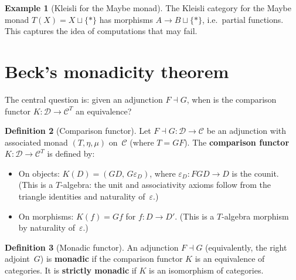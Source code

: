 \documentclass[a4paper,12pt]{book}
\theoremstyle{definition}
\newtheorem{definition}{Definition}[section]
\newtheorem{example}[definition]{Example}
\theoremstyle{plain}
\theoremstyle{remark}
\begin{document}
\begin{example}[Kleisli for the Maybe monad]\label{ex:kleisli-maybe}
The Kleisli category for the Maybe monad $T(X)=X\sqcup\{*\}$ has
morphisms $A\to B\sqcup\{*\}$, i.e.\ partial functions.  This
captures the idea of computations that may fail.
\end{example}


\section{Beck's monadicity theorem}\label{sec:beck}

The central question is: given an adjunction $F\dashv G$, when is the
comparison functor $K\colon\mathcal{D}\to\mathcal{C}^T$ an equivalence?

\begin{definition}[Comparison functor]\label{def:comparison-functor}
Let $F\dashv G\colon\mathcal{D}\to\mathcal{C}$ be an adjunction with
associated monad $(T,\eta,\mu)$ on~$\mathcal{C}$ (where $T = GF$).
The \textbf{comparison functor}
$K\colon\mathcal{D}\to\mathcal{C}^T$
is defined by:
\begin{itemize}
\item On objects: $K(D) = (GD,\, G\varepsilon_D)$, where
    $\varepsilon_D\colon FGD\to D$ is the counit.
    (This is a $T$-algebra: the unit and associativity axioms follow
    from the triangle identities and naturality of~$\varepsilon$.)
\item On morphisms: $K(f) = Gf$ for $f\colon D\to D'$.
    (This is a $T$-algebra morphism by naturality of~$\varepsilon$.)
\end{itemize}
\end{definition}

\begin{definition}[Monadic functor]\label{def:monadic}
An adjunction $F\dashv G$ (equivalently, the right adjoint~$G$) is
\textbf{monadic} if the comparison functor $K$ is an equivalence of
categories.  It is \textbf{strictly monadic} if $K$ is an isomorphism
of categories.
\end{definition}
\end{document}
